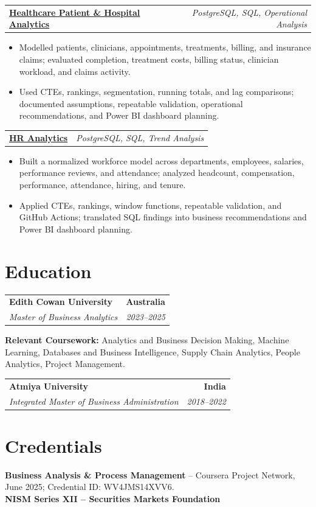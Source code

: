 \documentclass[letterpaper,10pt]{article}
\makeatletter
\newcommand{\role}[4]{%
  \begin{tabularx}{\textwidth}{@{}Xr@{}}
    \textbf{#1} & \textbf{#2} \\
    \textit{#3} & \textit{#4}
  \end{tabularx}\vspace{-1pt}
}
\newcommand{\project}[2]{%
  \begin{tabularx}{\textwidth}{@{}Xr@{}}
    \textbf{#1} & \textit{#2}
  \end{tabularx}\vspace{-1pt}
}
\makeatother
\begin{document}
\project{\href{https://github.com/jainalimehta/Healthcare-Analytics}{Healthcare Patient \& Hospital Analytics}}{PostgreSQL, SQL, Operational Analysis}
\begin{itemize}
  \item Modelled patients, clinicians, appointments, treatments, billing, and insurance claims; evaluated completion, treatment costs, billing status, clinician workload, and claims activity.
  \item Used CTEs, rankings, segmentation, running totals, and lag comparisons; documented assumptions, repeatable validation, operational recommendations, and Power BI dashboard planning.
\end{itemize}
\vspace{1pt}

\project{\href{https://github.com/jainalimehta/HR-Analytics}{HR Analytics}}{PostgreSQL, SQL, Trend Analysis}
\begin{itemize}
  \item Built a normalized workforce model across departments, employees, salaries, performance reviews, and attendance; analyzed headcount, compensation, performance, attendance, hiring, and tenure.
  \item Applied CTEs, rankings, window functions, repeatable validation, and GitHub Actions; translated SQL findings into business recommendations and Power BI dashboard planning.
\end{itemize}

\section{Education}
\role{Edith Cowan University}{Australia}{Master of Business Analytics}{2023--2025}
\small\textbf{Relevant Coursework:} Analytics and Business Decision Making, Machine Learning, Databases and Business Intelligence, Supply Chain Analytics, People Analytics, Project Management.\\[2pt]
\role{Atmiya University}{India}{Integrated Master of Business Administration}{2018--2022}

\section{Credentials}
\small\textbf{Business Analysis \& Process Management} -- Coursera Project Network, June 2025; Credential ID: WV4JMS14XVV6.\\[-0.2pt]
\small\textbf{NISM Series XII -- Securities Markets Foundation}
\end{document}
